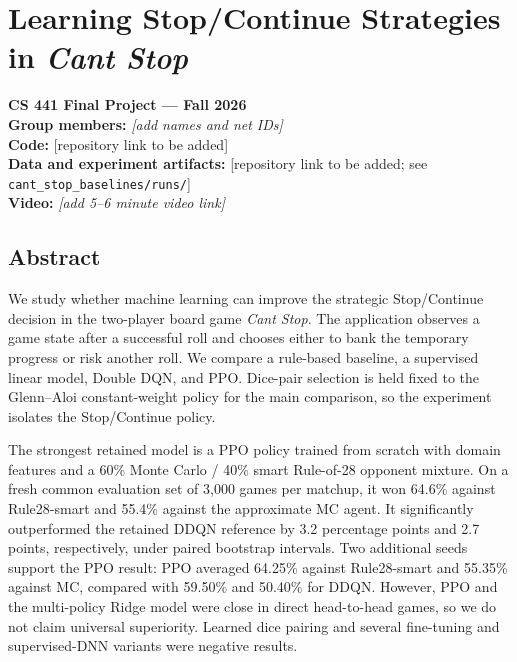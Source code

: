 \documentclass[
  11pt,
]{article}
\author{}
\date{}
\begin{document}
\section{\texorpdfstring{Learning Stop/Continue Strategies in
\emph{Can\textquotesingle t
Stop}}{Learning Stop/Continue Strategies in Can\textquotesingle t Stop}}\label{learning-stopcontinue-strategies-in-cant-stop}

\textbf{CS 441 Final Project --- Fall 2026}\\
\textbf{Group members:} \emph{{[}add names and net IDs{]}}\\
\textbf{Code:} {[}repository link to be added{]}\\
\textbf{Data and experiment artifacts:} {[}repository link to be added;
see \texttt{cant\_stop\_baselines/runs/}{]}\\
\textbf{Video:} \emph{{[}add 5--6 minute video link{]}}

\subsection{Abstract}\label{abstract}

We study whether machine learning can improve the strategic
Stop/Continue decision in the two-player board game
\emph{Can\textquotesingle t Stop}. The application observes a game state
after a successful roll and chooses either to bank the temporary
progress or risk another roll. We compare a rule-based baseline, a
supervised linear model, Double DQN, and PPO. Dice-pair selection is
held fixed to the Glenn--Aloi constant-weight policy for the main
comparison, so the experiment isolates the Stop/Continue policy.

The strongest retained model is a PPO policy trained from scratch with
domain features and a 60\% Monte Carlo / 40\% smart Rule-of-28 opponent
mixture. On a fresh common evaluation set of 3,000 games per matchup, it
won 64.6\% against Rule28-smart and 55.4\% against the approximate MC
agent. It significantly outperformed the retained DDQN reference by 3.2
percentage points and 2.7 points, respectively, under paired bootstrap
intervals. Two additional seeds support the PPO result: PPO averaged
64.25\% against Rule28-smart and 55.35\% against MC, compared with
59.50\% and 50.40\% for DDQN. However, PPO and the multi-policy Ridge
model were close in direct head-to-head games, so we do not claim
universal superiority. Learned dice pairing and several fine-tuning and
supervised-DNN variants were negative results.
\end{document}
